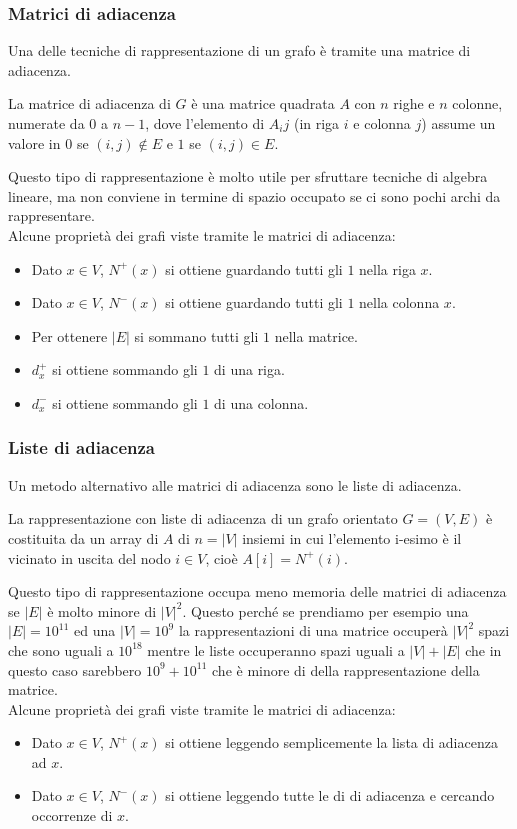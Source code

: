 \subsubsection{Matrici di adiacenza}
Una delle tecniche di rappresentazione di un grafo è tramite una matrice di adiacenza.
\begin{definition}
    La matrice di adiacenza di $G$ è una matrice quadrata $A$ con $n$ righe e $n$ colonne, numerate da $0$ a $n-1$, dove l'elemento di $A_ij$ (in riga $i$ e colonna $j$) assume un valore in $0$ se $(i,j) \notin E$ e $1$ se $(i,j) \in E$.
\end{definition}
Questo tipo di rappresentazione è molto utile per sfruttare tecniche di algebra lineare, ma non conviene in termine di spazio occupato se ci sono pochi archi da rappresentare.\\
Alcune proprietà dei grafi viste tramite le matrici di adiacenza:
\begin{itemize}
    \item Dato $x \in V$, $N^+(x)$ si ottiene guardando tutti gli $1$ nella riga $x$.
    \item Dato $x \in V$, $N^-(x)$ si ottiene guardando tutti gli $1$ nella colonna $x$.
    \item Per ottenere $|E|$ si sommano tutti gli $1$ nella matrice.
    \item $d^+_x$ si ottiene sommando gli $1$ di una riga.
    \item $d^-_x$ si ottiene sommando gli $1$ di una colonna.
\end{itemize}

\subsubsection{Liste di adiacenza}
Un metodo alternativo alle matrici di adiacenza sono le liste di adiacenza.
\begin{definition}
    La rappresentazione con liste di adiacenza di un grafo orientato $G = (V,E)$ è costituita da un array di $A$ di $n = |V|$ insiemi in cui l'elemento i-esimo è il vicinato in uscita del nodo $i \in V$, cioè $A[i] = N^+(i)$.
\end{definition}
Questo tipo di rappresentazione occupa meno memoria delle matrici di adiacenza se $|E|$ è molto minore di $|V|^2$. Questo perché se prendiamo per esempio una $|E| = 10^{11}$ ed una $|V| = 10^9$ la rappresentazioni di una matrice occuperà $|V|^2$ spazi che sono uguali a $10^{18}$ mentre le liste occuperanno spazi uguali a $|V| + |E|$ che in questo caso sarebbero $10^9 + 10^{11}$ che è minore di della rappresentazione della matrice.\\
Alcune proprietà dei grafi viste tramite le matrici di adiacenza:
\begin{itemize}
    \item Dato $x \in V$, $N^+(x)$ si ottiene leggendo semplicemente la lista di adiacenza ad $x$.
    \item Dato $x \in V$, $N^-(x)$ si ottiene leggendo tutte le di di adiacenza e cercando occorrenze di $x$.
\end{itemize}

